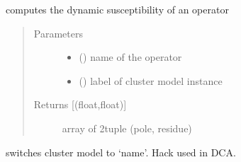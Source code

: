 \documentclass[letterpaper,10pt,english]{sphinxmanual}
\begin{document}
\begin{fulllineitems}
\label{\detokenize{functions:pyqcm.susceptibility_poles}}
\sphinxAtStartPar
computes the dynamic susceptibility of an operator
\begin{quote}\begin{description}
\item[{Parameters}] \leavevmode\begin{itemize}
\item {} 
\sphinxAtStartPar
{} () \textendash{} name of the operator

\item {} 
\sphinxAtStartPar
{} () \textendash{} label of cluster model instance

\end{itemize}

\item[{Returns {[}(float,float){]}}] \leavevmode
\sphinxAtStartPar
array of 2\sphinxhyphen{}tuple (pole, residue)

\end{description}\end{quote}

\end{fulllineitems}


\begin{fulllineitems}
\label{\detokenize{functions:pyqcm.switch_cluster_model}}
\sphinxAtStartPar
switches cluster model to ‘name’. Hack used in DCA.

\end{fulllineitems}

\end{document}
